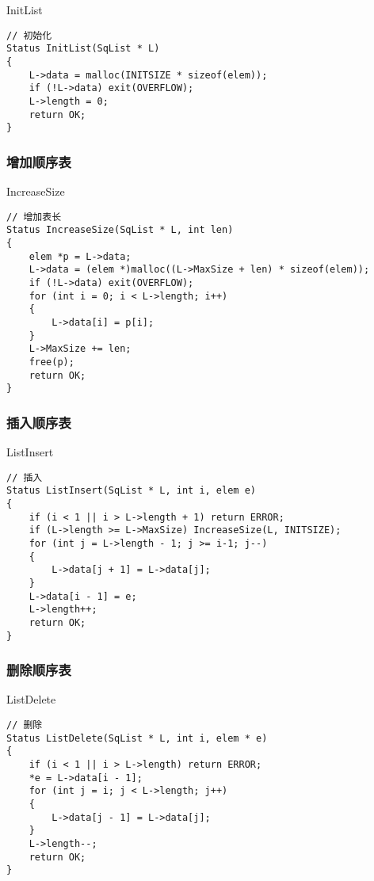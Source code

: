 \begin{macbox}{InitList}
	\begin{verbatim}
// 初始化
Status InitList(SqList * L)
{
    L->data = malloc(INITSIZE * sizeof(elem));
    if (!L->data) exit(OVERFLOW);
    L->length = 0;
    return OK;
}
    \end{verbatim}
\end{macbox}


\subsubsection{增加顺序表}

\begin{macbox}{IncreaseSize}
    \begin{verbatim}
// 增加表长
Status IncreaseSize(SqList * L, int len)
{
    elem *p = L->data;
    L->data = (elem *)malloc((L->MaxSize + len) * sizeof(elem));
    if (!L->data) exit(OVERFLOW);
    for (int i = 0; i < L->length; i++)
    {
        L->data[i] = p[i];
    }
    L->MaxSize += len;
    free(p);
    return OK;
}
    \end{verbatim}
\end{macbox}


\subsubsection{插入顺序表}

\begin{macbox}{ListInsert}
    \begin{verbatim}
// 插入
Status ListInsert(SqList * L, int i, elem e)
{
    if (i < 1 || i > L->length + 1) return ERROR;
    if (L->length >= L->MaxSize) IncreaseSize(L, INITSIZE);
    for (int j = L->length - 1; j >= i-1; j--)
    {
        L->data[j + 1] = L->data[j];
    }
    L->data[i - 1] = e;
    L->length++;
    return OK;
}
    \end{verbatim}
\end{macbox}

\subsubsection{删除顺序表}

\begin{macbox}{ListDelete}
    \begin{verbatim}
// 删除
Status ListDelete(SqList * L, int i, elem * e)
{
    if (i < 1 || i > L->length) return ERROR;
    *e = L->data[i - 1];
    for (int j = i; j < L->length; j++)
    {
        L->data[j - 1] = L->data[j];
    }
    L->length--;
    return OK;
}
    \end{verbatim}
\end{macbox}

